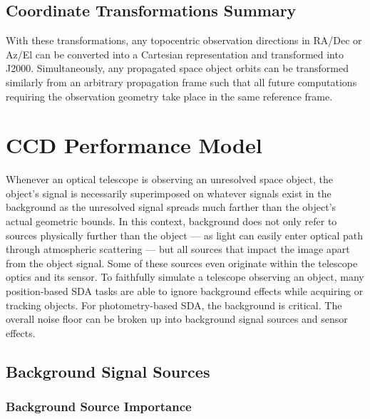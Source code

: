 \subsection{Coordinate Transformations Summary}

With these transformations, any topocentric observation directions in RA/Dec or Az/El can be converted into a Cartesian representation and transformed into J2000. Simultaneously, any propagated space object orbits can be transformed similarly from an arbitrary propagation frame such that all future computations requiring the observation geometry take place in the same reference frame. 

\section{CCD Performance Model} \label{sec:ccd_performance}

Whenever an optical telescope is observing an unresolved space object, the object's signal is necessarily superimposed on whatever signals exist in the background as the unresolved signal spreads much farther than the object's actual geometric bounds. In this context, background does not only refer to sources physically further than the object --- as light can easily enter optical path through atmospheric scattering --- but all sources that impact the image apart from the object signal. Some of these sources even originate within the telescope optics and its sensor. To faithfully simulate a telescope observing an object, many position-based SDA tasks are able to ignore background effects while acquiring or tracking objects. For photometry-based SDA, the background is critical. The overall noise floor can be broken up into background signal sources and sensor effects.

\subsection{Background Signal Sources}

\subsubsection{Background Source Importance}

